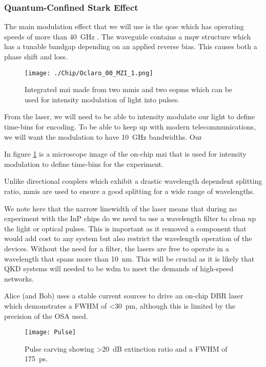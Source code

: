 \subsubsection{Quantum-Confined Stark Effect}

The main modulation effect that we will use is the \ac{qcse} which has operating speeds of more than \SI{40}{GHz} \cite{qcse, smit2014}. The waveguide contains a \ac{mqw}  structure which has a tunable bandgap depending on an applied reverse bias. This causes both a phase shift and loss.

\begin{figure}[tbp]
	\texttt{[image: ./Chip/Oclaro\_00\_MZI\_1.png]}
	\caption[Integrated MZI microscope image]{Integrated \acl{mzi} made from two \acsp{mmi} and two \acsp{eopm}  which can be used for intensity modulation of light into pulses.}
	\label{fig:InP_MZI}
\end{figure}

From the laser, we will need to be able to intensity modulate our light to define time-bins for encoding. To be able to keep up with modern telecommunications, we will want the modulation to have \SI{10}{GHz} bandwidths. Our

In figure \ref{fig:InP_MZI} is a microscope image of the on-chip \ac{mzi} that is used for intensity modulation to define time-bins for the experiment.

Unlike directional couplers which exhibit a drastic wavelength dependent splitting ratio, \acp{mmi} are used to ensure a good splitting for a wide range of wavelengths. 

We note here that the narrow linewidth of the laser means that during no experiment with the \ac{InP} chips do we need to use a wavelength filter to clean up the light or optical pulses. This is important as it removed a component that would add cost to any system but also restrict the wavelength operation of the devices. Without the need for a filter, the lasers are free to operate in a wavelength that spans more than \SI{10}{nm}. This will be crucial as it is likely that \ac{QKD} systems will needed to be \ac{wdm} to meet the demands of high-speed networks.

Alice (and Bob) uses a stable current sources to drive an on-chip \ac{DBR} laser which demonstrates a \ac{FWHM} of \SI{<30}{pm}, although this is limited by the precision of the \ac{OSA} used.

\begin{figure}[tbp]
	\centering
	\texttt{[image: Pulse]}
	\caption[Pulse carving]{Pulse carving showing \SI{>20}{dB} extinction ratio and a \ac{FWHM} of \SI{175}{\ps}.}
	\label{fig:pulses}
\end{figure}

